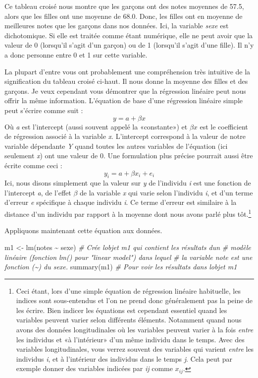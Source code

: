 \documentclass[
]{book}
\newenvironment{Shaded}{\begin{snugshade}}{\end{snugshade}}
\newcommand{\CommentTok}[1]{\textcolor[rgb]{0.56,0.35,0.01}{\textit{#1}}}
\newcommand{\FunctionTok}[1]{\textcolor[rgb]{0.00,0.00,0.00}{#1}}
\newcommand{\NormalTok}[1]{#1}
\newcommand{\OtherTok}[1]{\textcolor[rgb]{0.56,0.35,0.01}{#1}}
\newcommand{\SpecialCharTok}[1]{\textcolor[rgb]{0.00,0.00,0.00}{#1}}
\begin{document}
Ce tableau croisé nous montre que les garçons ont des notes moyennes de 57.5, alors que les filles ont une moyenne de 68.0. Donc, les filles ont en moyenne de meilleures notes que les garçons dans nos données. Ici, la variable \emph{sexe} est dichotomique. Si elle est traitée comme étant numérique, elle ne peut avoir que la valeur de 0 (lorsqu'il s'agit d'un garçon) ou de 1 (lorsqu'il s'agit d'une fille). Il n'y a donc personne entre 0 et 1 sur cette variable.

La plupart d'entre vous ont probablement une compréhension très intuitive de la signification du tableau croisé ci-haut. Il nous donne la moyenne des filles et des garçons. Je veux cependant vous démontrer que la régression linéaire peut nous offrir la même information. L'équation de base d'une régression linéaire simple peut s'écrire comme suit :
\[ y=a+\beta x \]
Où \emph{a} est l'intercept (aussi souvent appelé la «constante») et \(\beta x\) est le coefficient de régression associé à la variable \emph{x}. L'intercept correspond à la valeur de notre variable dépendante \emph{Y} quand toutes les autres variables de l'équation (ici seulement \emph{x}) ont une valeur de 0. Une formulation plus précise pourrait aussi être écrite comme ceci :
\[ y_i=a+\beta x_i + e_i \]
Ici, nous disons simplement que la valeur sur \emph{y} de l'individu \emph{i} est une fonction de l'intercept \emph{a}, de l'effet \(\beta\) de la variable \emph{x} qui varie selon l'individu \emph{i}, et d'un terme d'erreur \emph{e} spécifique à chaque individu \emph{i}. Ce terme d'erreur est similaire à la distance d'un individu par rapport à la moyenne dont nous avons parlé plus tôt.\footnote{Ceci étant, lors d'une simple équation de régression linéaire habituelle, les indices sont sous-entendus et l'on ne prend donc généralement pas la peine de les écrire. Bien indicer les équations est cependant essentiel quand les variables peuvent varier selon différents éléments. Notamment quand nous avons des données longitudinales où les variables peuvent varier à la fois \emph{entre} les individus et «à l'intérieur» d'un même individu dans le temps. Avec des variables longitudinales, vous verrez souvent des variables qui varient \emph{entre} les individus \emph{i}, et à l'intérieur des individus dans le temps \emph{j}. Cela peut par exemple donner des variables indicées par \emph{ij} comme \({x}_{ij}\).}

Appliquons maintenant cette équation aux données.

\begin{Shaded}
\begin{Highlighting}[]
\NormalTok{m1 }\OtherTok{\textless{}{-}} \FunctionTok{lm}\NormalTok{(notes }\SpecialCharTok{\textasciitilde{}}\NormalTok{ sexe) }\CommentTok{\# Crée l\textquotesingle{}objet m1 qui contient les résultats d\textquotesingle{}un}
\CommentTok{\# modèle linéaire (fonction lm() pour "linear model") dans lequel }
\CommentTok{\# la variable note est une fonction (\textasciitilde{}) du sexe.}
\FunctionTok{summary}\NormalTok{(m1) }\CommentTok{\# Pour voir les résultats dans l\textquotesingle{}objet m1}
\end{Highlighting}
\end{Shaded}
\end{document}
